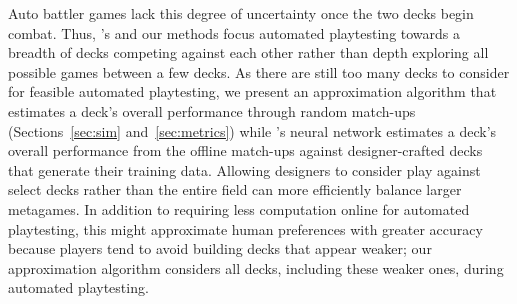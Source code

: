 Auto battler games lack this degree of uncertainty once the two decks begin combat.
Thus, \citeauthor{tencent_autobattle_lineup}'s 
and our methods focus automated playtesting towards a breadth of decks competing
against each other rather than depth exploring all possible games between a few
decks.  As there are still too many decks to consider for feasible automated
playtesting, we present an approximation algorithm that estimates a deck's overall
performance through random match-ups (Sections~\ref{sec:sim} and~\ref{sec:metrics}) while
\citeauthor{tencent_autobattle_lineup}'s neural network estimates a deck's overall
performance from the offline match-ups against designer-crafted decks that generate
their training data.  Allowing designers to consider play against select decks
rather than the entire field can more efficiently balance larger metagames.
In addition to requiring less computation online for automated playtesting, this
might approximate human preferences with greater accuracy because players
tend to avoid building decks that appear weaker; our approximation algorithm
considers all decks, including these weaker ones, during automated playtesting.
